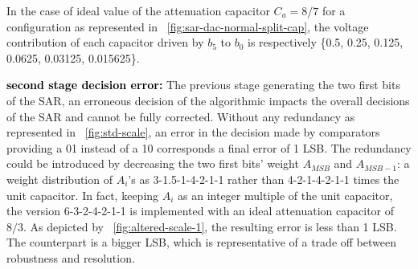 In the case of ideal value of the attenuation capacitor $C_a = 8/7$ for a configuration as represented in \figurename~\ref{fig:sar-dac-normal-split-cap}, the voltage contribution of each capacitor driven by $b_5$ to $b_0$ is respectively \{0.5, 0.25, 0.125, 0.0625, 0.03125, 0.015625\}.

\textbf{\textcolor{black}{second stage decision error:}}
The previous stage generating the two first bits of the SAR, an erroneous decision of the algorithmic impacts the overall decisions of the SAR and cannot be fully corrected. Without any redundancy as represented in \figurename~\ref{fig:std-scale}, an error in the decision made by comparators providing a 01 instead of a 10 corresponds a final error of 1 LSB\@. The redundancy could be introduced by decreasing the two first bits’ weight \(A_{MSB}\) and \(A_{MSB-1}\): a weight distribution of \(A_i\)'s as 3-1.5-1-4-2-1-1 rather than 4-2-1-4-2-1-1 times the unit capacitor. In fact, keeping \(A_i\) as an integer multiple of the unit capacitor, the version 6-3-2-4-2-1-1 is implemented with an ideal attenuation capacitor of \(8/3\). As depicted by \figurename~\ref{fig:altered-scale-1}, the resulting error is less than 1 LSB\@. The counterpart is a bigger LSB, which is representative of a trade off between robustness and resolution. 

